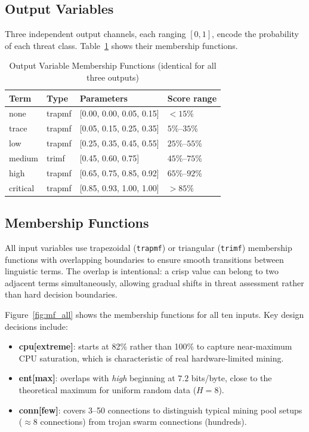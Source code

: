\documentclass[conference]{IEEEtran}
\begin{document}
\subsection{Output Variables}

Three independent output channels, each ranging $[0, 1]$, encode the
probability of each threat class. Table~\ref{tab:outputs} shows their
membership functions.

\begin{table}[H]
\centering
\caption{Output Variable Membership Functions (identical for all three outputs)}
\label{tab:outputs}
\renewcommand{\arraystretch}{1.25}
\begin{tabular}{llll}
\toprule
\textbf{Term} & \textbf{Type} & \textbf{Parameters} & \textbf{Score range} \\
\midrule
none     & trapmf & [0.00, 0.00, 0.05, 0.15] & $< 15\%$ \\
trace    & trapmf & [0.05, 0.15, 0.25, 0.35] & $5\%$--$35\%$ \\
low      & trapmf & [0.25, 0.35, 0.45, 0.55] & $25\%$--$55\%$ \\
medium   & trimf  & [0.45, 0.60, 0.75]       & $45\%$--$75\%$ \\
high     & trapmf & [0.65, 0.75, 0.85, 0.92] & $65\%$--$92\%$ \\
critical & trapmf & [0.85, 0.93, 1.00, 1.00] & $> 85\%$ \\
\bottomrule
\end{tabular}
\end{table}

\subsection{Membership Functions}

All input variables use trapezoidal (\texttt{trapmf}) or triangular
(\texttt{trimf}) membership functions with overlapping boundaries to
ensure smooth transitions between linguistic terms. The overlap is
intentional: a crisp value can belong to two adjacent terms
simultaneously, allowing gradual shifts in threat assessment rather than
hard decision boundaries.

Figure~\ref{fig:mf_all} shows the membership functions for all ten
inputs. Key design decisions include:

\begin{itemize}[leftmargin=2em]
  \item \textbf{cpu[extreme]}: starts at 82\% rather than 100\% to
        capture near-maximum CPU saturation, which is characteristic of
        real hardware-limited mining.
  \item \textbf{ent[max]}: overlaps with \textit{high} beginning at
        $7.2$ bits/byte, close to the theoretical maximum for uniform
        random data ($H=8$).
  \item \textbf{conn[few]}: covers 3--50 connections to distinguish
        typical mining pool setups ($\approx 8$ connections) from
        trojan swarm connections (hundreds).
\end{itemize}
\end{document}
